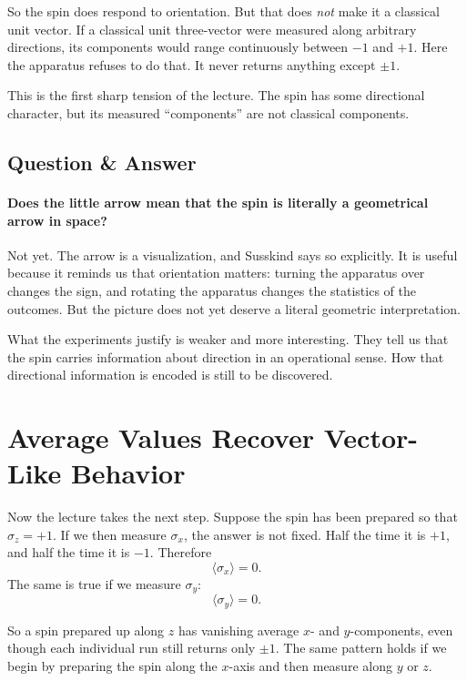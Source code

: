 So the spin does respond to orientation. But that does \emph{not} make it a classical unit vector. If a classical unit three-vector were measured along arbitrary directions, its components would range continuously between \(-1\) and \(+1\). Here the apparatus refuses to do that. It never returns anything except \(\pm 1\).

This is the first sharp tension of the lecture. The spin has some directional character, but its measured ``components'' are not classical components.

\subsection{Question \& Answer}

\paragraph{Does the little arrow mean that the spin is literally a geometrical arrow in space?}

Not yet. The arrow is a visualization, and Susskind says so explicitly. It is useful because it reminds us that orientation matters: turning the apparatus over changes the sign, and rotating the apparatus changes the statistics of the outcomes. But the picture does not yet deserve a literal geometric interpretation.

What the experiments justify is weaker and more interesting. They tell us that the spin carries information about direction in an operational sense. How that directional information is encoded is still to be discovered.

\section{Average Values Recover Vector-Like Behavior}

Now the lecture takes the next step. Suppose the spin has been prepared so that \(\sigma_z=+1\). If we then measure \(\sigma_x\), the answer is not fixed. Half the time it is \(+1\), and half the time it is \(-1\). Therefore
\begin{equation}
\langle \sigma_x\rangle = 0.
\end{equation}
The same is true if we measure \(\sigma_y\):
\begin{equation}
\langle \sigma_y\rangle = 0.
\end{equation}

So a spin prepared up along \(z\) has vanishing average \(x\)- and \(y\)-components, even though each individual run still returns only \(\pm 1\). The same pattern holds if we begin by preparing the spin along the \(x\)-axis and then measure along \(y\) or \(z\).

